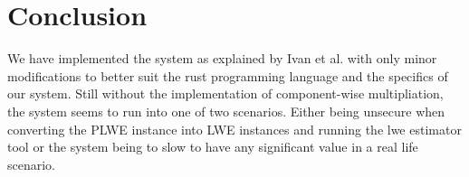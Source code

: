 \documentclass[../main.tex]{subfiles}
\begin{document}
\section{Conclusion}
	We have implemented the system as explained by Ivan et al. %
	with only minor modifications to better suit the rust programming language
	and the specifics of our system.
	Still without the implementation of component-wise multipliation,
	the system seems to run into one of two scenarios.
	Either being unsecure when converting the PLWE instance into LWE instances
	and running the lwe estimator tool or the system being to slow to have
	any significant value in a real life scenario.
\end{document}
